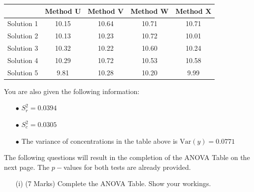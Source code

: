 \documentclass[a4paper,12pt]{article}
\begin{document}
\begin{itemize}
\begin{table}[ht]
	\centering
	\begin{tabular}{|r||c|c|c|c|}
		\hline
		& Method U & Method V & Method W & Method X \\ 
		\hline
	Solution 1 & 10.15 & 10.64 & 10.71 & 10.71 \\ 
	Solution 2 & 10.13 & 10.23 & 10.72 & 10.01 \\ 
	Solution 3 & 10.32 & 10.22 & 10.60 & 10.24 \\ 
	Solution 4 & 10.29 & 10.72 & 10.53 & 10.58 \\ 
	Solution 5 & 9.81 & 10.28 & 10.20 & 9.99 \\ 
		\hline
	\end{tabular}
\end{table}


%	
%	
%	
%	
%	
%	
%	
%	
%	
%	
	
	\noindent You are also given the following information:
	\begin{itemize}
		\item[$\bullet$] $S^2_r = 0.0394$
		\item[$\bullet$] $S^2_c = 0.0305$
		\item[$\bullet$] The variance of concentrations in the table above is $\mbox{Var}(y) = 0.0771$
	\end{itemize}

	\noindent The following questions will result in the completion of the ANOVA Table on the next page. The $p-$values for both tests are already provided.
	\begin{itemize}
		\item[(i)](7 Marks) Complete the ANOVA Table. Show your workings.


\end{itemize}
\end{itemize}
\end{document}
